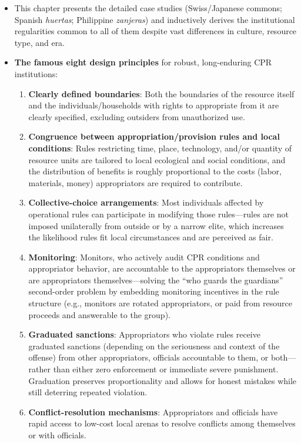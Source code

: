 \documentclass[12pt]{article}
\begin{document}
\begin{itemize}[leftmargin=*, itemsep=4pt]
    \item This chapter presents the detailed case studies (Swiss/Japanese commons; Spanish \textit{huertas}; Philippine \textit{zanjeras}) and inductively derives the institutional regularities common to all of them despite vast differences in culture, resource type, and era.
    \item \textbf{The famous eight design principles} for robust, long-enduring CPR institutions:
    \begin{enumerate}
        \item \textbf{Clearly defined boundaries}: Both the boundaries of the resource itself and the individuals/households with rights to appropriate from it are clearly specified, excluding outsiders from unauthorized use.
        \item \textbf{Congruence between appropriation/provision rules and local conditions}: Rules restricting time, place, technology, and/or quantity of resource units are tailored to local ecological and social conditions, and the distribution of benefits is roughly proportional to the costs (labor, materials, money) appropriators are required to contribute.
        \item \textbf{Collective-choice arrangements}: Most individuals affected by operational rules can participate in modifying those rules---rules are not imposed unilaterally from outside or by a narrow elite, which increases the likelihood rules fit local circumstances and are perceived as fair.
        \item \textbf{Monitoring}: Monitors, who actively audit CPR conditions and appropriator behavior, are accountable to the appropriators themselves or are appropriators themselves---solving the ``who guards the guardians'' second-order problem by embedding monitoring incentives in the rule structure (e.g., monitors are rotated appropriators, or paid from resource proceeds and answerable to the group).
        \item \textbf{Graduated sanctions}: Appropriators who violate rules receive graduated sanctions (depending on the seriousness and context of the offense) from other appropriators, officials accountable to them, or both---rather than either zero enforcement or immediate severe punishment. Graduation preserves proportionality and allows for honest mistakes while still deterring repeated violation.
        \item \textbf{Conflict-resolution mechanisms}: Appropriators and officials have rapid access to low-cost local arenas to resolve conflicts among themselves or with officials.

\end{enumerate}
\end{itemize}
\end{document}
